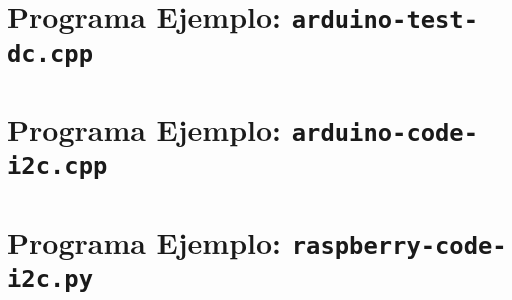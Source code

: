 %
%


\cleardoublepage
\section{Programa Ejemplo: \texttt{arduino-test-dc.cpp}}%
\label{sec:appendix1}


\cleardoublepage
\section{Programa Ejemplo: \texttt{arduino-code-i2c.cpp}}%
\label{sec:appendix3}


\cleardoublepage
\section{Programa Ejemplo: \texttt{raspberry-code-i2c.py}}%
\label{sec:appendix2}

